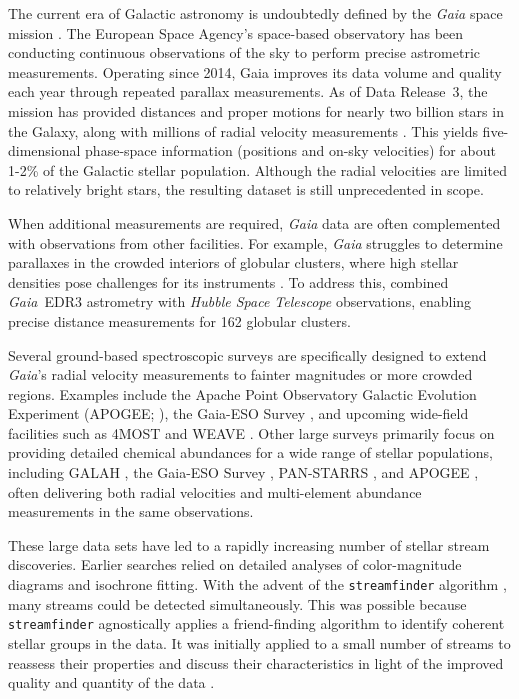     The current era of Galactic astronomy is undoubtedly defined by the \emph{Gaia} space mission \citep{2016A&A...595A...1G,2016A&A...595A...2G,2018A&A...616A...1G,2021A&A...650C...3G,2023A&A...674A...1G}. The European Space Agency's space-based observatory has been conducting continuous observations of the sky to perform precise astrometric measurements. Operating since 2014, Gaia improves its data volume and quality each year through repeated parallax measurements.  As of Data Release~3, the mission has provided distances and proper motions for nearly two billion stars in the Galaxy, along with millions of radial velocity measurements \citep{2023A&A...674A...1G}. This yields five-dimensional phase-space information (positions and on-sky velocities) for about 1-2\% of the Galactic stellar population. Although the radial velocities are limited to relatively bright stars, the resulting dataset is still unprecedented in scope.

    When additional measurements are required, \emph{Gaia} data are often complemented with observations from other facilities.  For example, \emph{Gaia} struggles to determine parallaxes in the crowded interiors of globular clusters, where high stellar densities pose challenges for its instruments \citep{2017MNRAS.467..412P}. To address this, \citet{2021MNRAS.505.5957B} combined \emph{Gaia}~EDR3 astrometry with \emph{Hubble Space Telescope} observations, enabling precise distance measurements for 162 globular clusters.

    Several ground-based spectroscopic surveys are specifically designed to extend \emph{Gaia}'s radial velocity measurements to fainter magnitudes or more crowded regions.  Examples include the Apache Point Observatory Galactic Evolution Experiment (APOGEE; \citep{2017AJ....154...94M}), the Gaia-ESO Survey \citep{2023A&A...676A.129H}, and upcoming wide-field facilities such as 4MOST \citep{2019Msngr.175....3D} and WEAVE \citep{2014SPIE.9147E..0LD}.  Other large surveys primarily focus on providing detailed chemical abundances for a wide range of stellar populations, including GALAH \citep{2012ASPC..458..421Z}, the Gaia-ESO Survey \citep{2023A&A...676A.129H}, PAN-STARRS \citep{2016arXiv161205560C}, and APOGEE \citep{2017AJ....154...94M}, often delivering both radial velocities and multi-element abundance measurements in the same observations.

    These large data sets have led to a rapidly increasing number of stellar stream discoveries. Earlier searches relied on detailed analyses of color-magnitude diagrams and isochrone fitting. With the advent of the \texttt{streamfinder} algorithm \citep{2018MNRAS.477.4063M,2018MNRAS.478.3862M}, many streams could be detected simultaneously. This was possible because \texttt{streamfinder} agnostically applies a friend-finding algorithm to identify coherent stellar groups in the data. It was initially applied to a small number of streams to reassess their properties and discuss their characteristics in light of the improved quality and quantity of the data \citep{2019NatAs...3..667I,2020ApJ...891..161I}.

